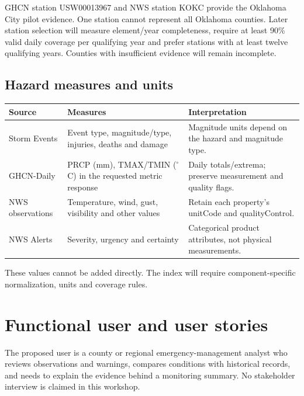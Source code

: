 GHCN station USW00013967 and NWS station KOKC provide the Oklahoma City pilot
evidence. One station cannot represent all Oklahoma counties. Later station
selection will measure element/year completeness, require at least 90\% valid
daily coverage per qualifying year and prefer stations with at least twelve
qualifying years. Counties with insufficient evidence will remain incomplete.

\subsection{Hazard measures and units}
\begin{tabularx}{\textwidth}{lYY}
\toprule Source & Measures & Interpretation \\
\midrule
Storm Events & Event type, magnitude/type, injuries, deaths and damage & Magnitude units depend on the hazard and magnitude type. \\
GHCN-Daily & PRCP (mm), TMAX/TMIN ($^{\circ}$C) in the requested metric response & Daily totals/extrema; preserve measurement and quality flags. \\
NWS observations & Temperature, wind, gust, visibility and other values & Retain each property's unitCode and qualityControl. \\
NWS Alerts & Severity, urgency and certainty & Categorical product attributes, not physical measurements. \\
\bottomrule
\end{tabularx}
These values cannot be added directly. The index will require component-specific
normalization, units and coverage rules.

\section{Functional user and user stories}
The proposed user is a county or regional emergency-management analyst who
reviews observations and warnings, compares conditions with historical records,
and needs to explain the evidence behind a monitoring summary. No stakeholder
interview is claimed in this workshop.

